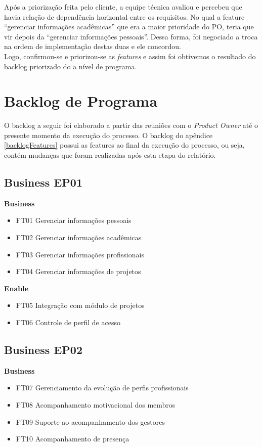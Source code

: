 Após a priorização feita pelo cliente, a equipe técnica avaliou e percebeu que havia relação de dependência horizontal entre os requisitos. No qual a feature “gerenciar informações acadêmicas” que era a maior prioridade do PO, teria que vir depois da “gerenciar informações pessoais”. Dessa forma, foi negociado a troca na ordem de implementação destas duas e ele concordou.\\

Logo, confirmou-se e priorizou-se as \textit{features} e assim foi obtivemos o resultado do backlog priorizado do a nível de programa.\\

\section{Backlog de Programa}

O backlog a seguir foi elaborado a partir das reuniões com o \textit{Product Owner} até o presente momento da execução do processo. O backlog do apêndice \ref{backlogFeatures} possui as features ao final da execução do processo, ou seja, contém mudanças que foram realizadas após esta etapa do relatório.

\subsection{Business EP01}
\textbf{Business}
\begin{itemize}\label{backlogParcialFT}
    \item FT01 Gerenciar informações pessoais
    \item FT02 Gerenciar informações acadêmicas
    \item FT03 Gerenciar informações profissionais
    \item FT04 Gerenciar informações de projetos
\end{itemize}
\textbf{Enable}
\begin{itemize}
    \item FT05 Integração com módulo de projetos
    \item FT06 Controle de perfil de acesso
\end{itemize}
\subsection{Business EP02}
\textbf{Business}
\begin{itemize}
    \item FT07 Gerenciamento da evolução de perfis profissionais
    \item FT08 Acompanhamento motivacional dos membros
    \item FT09 Suporte ao acompanhamento dos gestores
    \item FT10 Acompanhamento de presença
\end{itemize}
